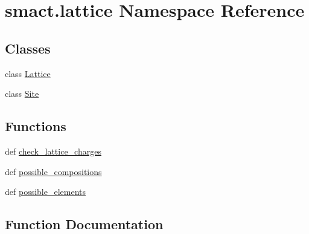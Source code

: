 \hypertarget{namespacesmact_1_1lattice}{}\section{smact.\+lattice Namespace Reference}
\label{namespacesmact_1_1lattice}
\subsection*{Classes}
\begin{DoxyCompactItemize}
\item 
class \hyperlink{classsmact_1_1lattice_1_1_lattice}{Lattice}
\item 
class \hyperlink{classsmact_1_1lattice_1_1_site}{Site}
\end{DoxyCompactItemize}
\subsection*{Functions}
\begin{DoxyCompactItemize}
\item 
def \hyperlink{namespacesmact_1_1lattice_a0380cf2cee37daa74c90bbefa4a16246}{check\+\_\+lattice\+\_\+charges}
\item 
def \hyperlink{namespacesmact_1_1lattice_af33a880afcb916626bc20669a084457f}{possible\+\_\+compositions}
\item 
def \hyperlink{namespacesmact_1_1lattice_a480b77e0ed0d4874c376d27f41ee0b3c}{possible\+\_\+elements}
\end{DoxyCompactItemize}


\subsection{Function Documentation}
\hypertarget{namespacesmact_1_1lattice_a0380cf2cee37daa74c90bbefa4a16246}{}
